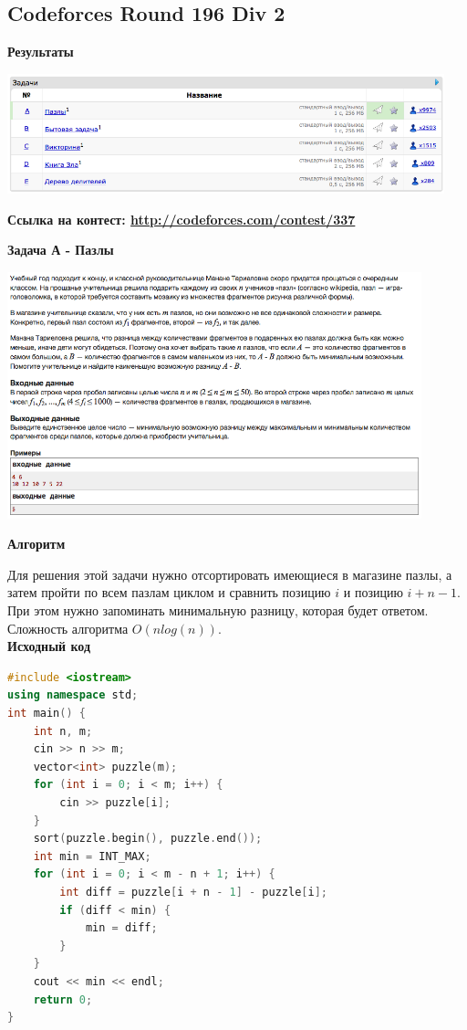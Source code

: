 \documentclass[a4paper,12pt]{article}
\begin{document}
\newpage
\subsection{Codeforces Round 196 Div 2}

\textbf{{\large Результаты}} \\
\begin{center}
\includegraphics[width=0.95\textwidth]{C_196/result.png}\\ [1cm]
\end{center}

\textbf{{\large Ссылка на контест: \url{http://codeforces.com/contest/337}}}

\newpage
\textbf{{\large Задача А - Пазлы}}

\begin{center}
\includegraphics[width=0.9\textwidth]{C_196/A.png}\\ [1cm]
\end{center}

\textbf{{\large Алгоритм}}

Для решения этой задачи нужно отсортировать имеющиеся в магазине пазлы, а затем пройти по всем пазлам циклом и сравнить позицию $i$ и позицию $i + n - 1$. При этом нужно запоминать минимальную разницу, которая будет ответом. Сложность алгоритма $O(nlog(n))$.\\


\textbf{{\large Исходный код}} \\
\begin{lstlisting}[language=C++]
#include <iostream>
using namespace std;
int main() {
    int n, m;
    cin >> n >> m;
    vector<int> puzzle(m);
    for (int i = 0; i < m; i++) {
        cin >> puzzle[i];
    }
    sort(puzzle.begin(), puzzle.end());
    int min = INT_MAX;
    for (int i = 0; i < m - n + 1; i++) {
        int diff = puzzle[i + n - 1] - puzzle[i];
        if (diff < min) {
            min = diff;
        }
    }
    cout << min << endl;
    return 0;
}
\end{lstlisting}
\end{document}
